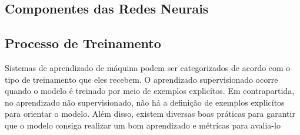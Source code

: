             
    \subsection{Componentes das Redes Neurais}


    \subsection{Processo de Treinamento}
        Sistemas de aprendizado de máquina podem ser categorizados de acordo com o tipo de treinamento que
        eles recebem. O aprendizado supervisionado ocorre quando o modelo é treinado por meio de exemplos explicítos. 
        Em contrapartida, no aprendizado não supervisionado, não há a definição de exemplos explicítos para orientar o 
        modelo. Além disso, existem diversas boas práticas para garantir que o modelo consiga realizar um bom aprendizado 
        e métricas para avalia-lo
         
